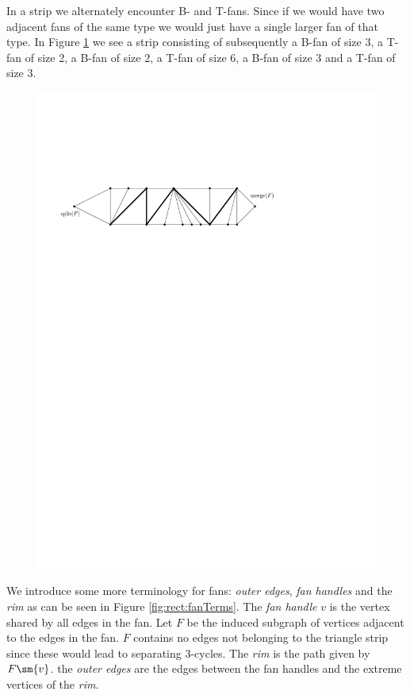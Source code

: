   In a strip we alternately encounter B- and T-fans. Since if we would have two adjacent fans of the same type we would just have a single larger fan of that type.
  In Figure \ref{fig:uni:fans} we see a strip consisting of subsequently a B-fan of size $3$, a T-fan of size 2, a B-fan of size $2$, a T-fan of size $6$, a B-fan of size $3$ and a T-fan of size $3$.

  \begin{figure}[h]
    \centering
    \includegraphics[scale=.9]{rectangularDuals/img/fans}
    \caption{}
    \label{fig:uni:fans}
  \end{figure}


 We introduce some more terminology for fans: \emph{outer edges}, \emph{fan handles} and the \emph{rim} as can be seen in Figure \ref{fig:rect:fanTerms}. The \emph{fan handle} $v$ is the vertex shared by all edges in the fan. Let $F$ be the induced subgraph of vertices adjacent to the edges in the fan. $F$ contains no edges not belonging to the triangle strip since these would lead to separating 3-cycles. The \emph{rim} is the path given by $F\sm{v}$.
  the \emph{outer edges} are the edges between the fan handles and the extreme vertices of the \emph{rim}.

